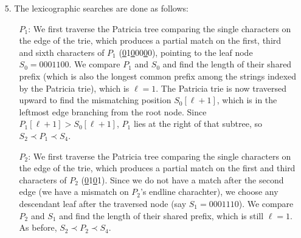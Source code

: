 \begin{itemize}
  \item[5.] The lexicographic searches are done as follows:
  \begin{itemize}

    \item[$P_1$:] We first traverse the Patricia tree comparing the single
    characters on the edge of the trie, which produces a partial match on the
    first, third and sixth characters of $P_1$
    (\underline{0}1\underline{0}00\underline{0}0), pointing to the leaf node
    $S_0 = 0001100$. We compare $P_1$ and $S_0$ and find the length of their
    shared prefix (which is also the longest common prefix among the strings
    indexed by the Patricia trie), which is $\ell = 1$. The Patricia trie is now
    traversed upward to find the mismatching position $S_0[\ell + 1]$, which is
    in the leftmost edge branching from the root node. Since $P_1[\ell + 1] >
    S_0[\ell + 1]$, $P_1$ lies at the right of that subtree, so $S_2 \prec P_1
    \prec S_4$.

    \item[$P_2$:] We first traverse the Patricia tree comparing the single
    characters on the edge of the trie, which produces a partial match on the
    first and third characters of $P_2$ (\underline{0}1\underline{0}1). Since we
    do not have a match after the second edge (we have a mismatch on $P_2$'s
    endline charachter), we choose any descendant leaf after the traversed node
    (say $S_1 = 0001110$). We compare $P_2$ and $S_1$ and find the length of
    their shared prefix, which is still $\ell = 1$. As before, $S_2 \prec P_2
    \prec S_4$.

  \end{itemize}
\end{itemize}
